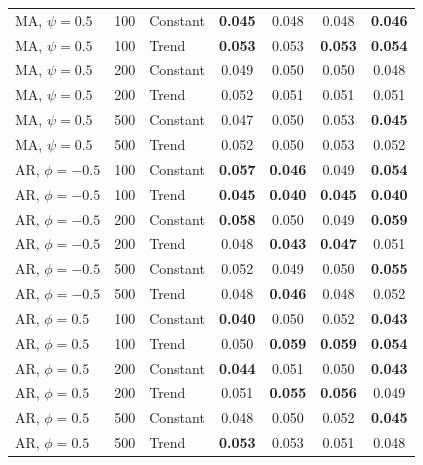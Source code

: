\begin{tabular}{lrlcccc}
\addlinespace
MA, $\psi = 0.5$ & 100 & Constant & \textbf{0.045} & 0.048 & 0.048 & \textbf{0.046} \\
MA, $\psi = 0.5$ & 100 & Trend & \textbf{0.053} & 0.053 & \textbf{0.053} & \textbf{0.054} \\
MA, $\psi = 0.5$ & 200 & Constant & 0.049 & 0.050 & 0.050 & 0.048 \\
MA, $\psi = 0.5$ & 200 & Trend & 0.052 & 0.051 & 0.051 & 0.051 \\
MA, $\psi = 0.5$ & 500 & Constant & 0.047 & 0.050 & 0.053 & \textbf{0.045} \\
MA, $\psi = 0.5$ & 500 & Trend & 0.052 & 0.050 & 0.053 & 0.052 \\
\addlinespace
AR, $\phi = -0.5$ & 100 & Constant & \textbf{0.057} & \textbf{0.046} & 0.049 & \textbf{0.054} \\
AR, $\phi = -0.5$ & 100 & Trend & \textbf{0.045} & \textbf{0.040} & \textbf{0.045} & \textbf{0.040} \\
AR, $\phi = -0.5$ & 200 & Constant & \textbf{0.058} & 0.050 & 0.049 & \textbf{0.059} \\
AR, $\phi = -0.5$ & 200 & Trend & 0.048 & \textbf{0.043} & \textbf{0.047} & 0.051 \\
AR, $\phi = -0.5$ & 500 & Constant & 0.052 & 0.049 & 0.050 & \textbf{0.055} \\
AR, $\phi = -0.5$ & 500 & Trend & 0.048 & \textbf{0.046} & 0.048 & 0.052 \\
\addlinespace
AR, $\phi = 0.5$ & 100 & Constant & \textbf{0.040} & 0.050 & 0.052 & \textbf{0.043} \\
AR, $\phi = 0.5$ & 100 & Trend & 0.050 & \textbf{0.059} & \textbf{0.059} & \textbf{0.054} \\
AR, $\phi = 0.5$ & 200 & Constant & \textbf{0.044} & 0.051 & 0.050 & \textbf{0.043} \\
AR, $\phi = 0.5$ & 200 & Trend & 0.051 & \textbf{0.055} & \textbf{0.056} & 0.049 \\
AR, $\phi = 0.5$ & 500 & Constant & 0.048 & 0.050 & 0.052 & \textbf{0.045} \\
AR, $\phi = 0.5$ & 500 & Trend & \textbf{0.053} & 0.053 & 0.051 & 0.048 \\
\bottomrule
\end{tabular}
